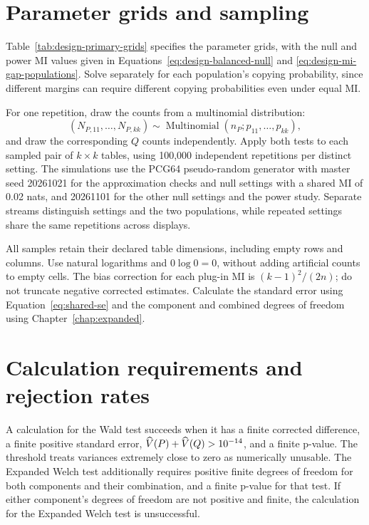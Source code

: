 \section{Parameter grids and sampling}

Table~\ref{tab:design-primary-grids} specifies the parameter grids, with
the null and power MI values given in
Equations~\eqref{eq:design-balanced-null} and
\eqref{eq:design-mi-gap-populations}. Solve separately for each
population's copying probability, since different margins can require
different copying probabilities even under equal MI.

For one repetition, draw the counts from a multinomial distribution:
\begin{equation}
 (N_{P,11},\ldots,N_{P,kk})\sim\operatorname{Multinomial}
      (n_P;p_{11},\ldots,p_{kk}),
\end{equation}
and draw the corresponding \(Q\) counts independently. Apply both tests
to each sampled pair of \(k\times k\) tables, using 100,000 independent
repetitions per distinct setting. The simulations use the PCG64
pseudo-random generator with master seed 20261021 for the approximation
checks and null settings with a shared MI of 0.02 nats, and 20261101 for
the other null settings and the power study. Separate streams distinguish settings and
the two populations, while repeated settings share the same repetitions
across displays.

All samples retain their declared table dimensions, including empty rows
and columns. Use natural logarithms and \(0\log0=0\), without adding
artificial counts to empty cells.
The bias correction for each plug-in MI is \((k-1)^2/(2n)\); do not truncate
negative corrected estimates. Calculate the standard error using
Equation~\eqref{eq:shared-se} and the component and combined degrees of freedom
using Chapter~\ref{chap:expanded}.

\section{Calculation requirements and rejection rates}
\label{sec:validity-rules}

A calculation for the Wald test succeeds when it has a finite corrected difference, a
finite positive standard error, \(\widehat V(P)+\widehat V(Q)>10^{-14}\), and a finite p-value.
The threshold treats variances extremely close to zero as numerically
unusable. The Expanded Welch test additionally requires positive finite degrees
of freedom for both components and their combination, and a finite
p-value for that test. If either component's degrees of freedom are
not positive and finite, the calculation for the Expanded Welch test is unsuccessful.

